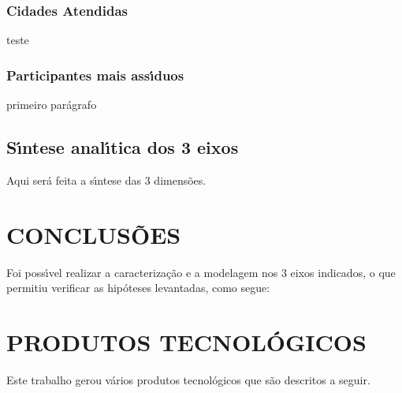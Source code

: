 \documentclass[
12pt,		%
openright,	%
twoside,  %
a4paper,			%
chapter=TITLE,		%
english,			%
french,				%
spanish,			%
brazil				%
]{USPSC-classe/USPSC}
\begin{document}
\subsection[Cidades Atendidas]{Cidades Atendidas}\label{Cidades Atendidas}
teste









\subsection[Participantes mais ass\'{\i}duos]{Participantes mais ass\'{\i}duos}\label{Participantes mais ass\'{\i}duos}
primeiro par\'agrafo









\section[S\'{\i}ntese anal\'{\i}tica dos 3 eixos]{S\'{\i}ntese anal\'{\i}tica dos 3 eixos}\label{S\'{\i}ntese anal\'{\i}tica dos 3 eixos}
Aqui ser\'a feita a s\'{\i}ntese das 3 dimens\~oes.









\chapter[CONCLUS\~OES]{CONCLUS\~OES}\label{CONCLUS\~OES}
Foi poss\'{\i}vel realizar a caracteriza\c{c}\~ao e a modelagem nos 3 eixos indicados, o que permitiu verificar as hip\'oteses levantadas, como segue:









\chapter[PRODUTOS TECNOL\'OGICOS]{PRODUTOS TECNOL\'OGICOS}\label{PRODUTOS TECNOL\'OGICOS}
Este trabalho gerou v\'arios produtos tecnol\'ogicos que s\~ao descritos a seguir.
\end{document}
